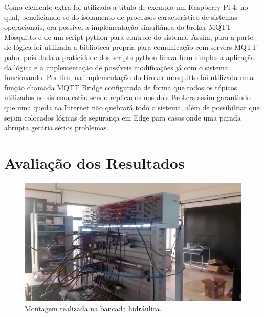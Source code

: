 Como elemento extra foi utilizado a título de exemplo um Raspberry Pi 4; no qual, beneficiando-se do isolamento de processos 
característico de sistemas operacionais, era possível a implementação simultânea do broker \ac{MQTT} Mosquitto e de um script 
python para controle do sistema. Assim, para a parte de lógica foi utilizada a biblioteca própria para comunicação com 
servers \ac{MQTT} paho, pois dada a praticidade dos scripts python ficava bem simples a aplicação da lógica e a implementação 
de possíveis modificações já com o sistema funcionando. Por fim, na implementação do Broker mosquitto foi utilizada uma 
função chamada \ac{MQTT} Bridge\cite{mosq-doc} configurada de forma que todos os tópicos utilizados no sistema estão sendo 
replicados nos dois Brokers assim garantindo que uma queda na Internet não quebrará todo o sistema, além de possibilitar
que sejam colocados lógicas de segurança em Edge para casos onde uma parada abrupta geraria sérios problemas.

\section{Avaliação dos Resultados}
\label{avaliacao}

\begin{figure}[htb]
    \begin{center}
        \includegraphics[scale=0.5]{figs/exp_h.png}
    \end{center}
    \caption{\label{fig:exp2} Montagem realizada na bancada hidráulica.} 
\end{figure}

